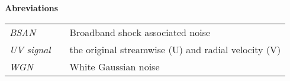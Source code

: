 \documentclass[12pt, oneside]{book}
\begin{document}
\textbf{\huge Abreviations}\\[1cm]
\renewcommand{\arraystretch}{1.2}
\noindent\begin{tabular}{@{}lcl@{}}
\textit{BSAN} 	& & Broadband shock associated noise \\
\textit{UV signal}	& & the original streamwise (U) and radial velocity (V) \\
\textit{WGN} 		& & White Gaussian noise
\end{tabular}
\clearpage %



\mainmatter %

% 
% 
% 
% 

\appendix %

% 
% 

\backmatter
{}
\clearpage %

%
\end{document}
